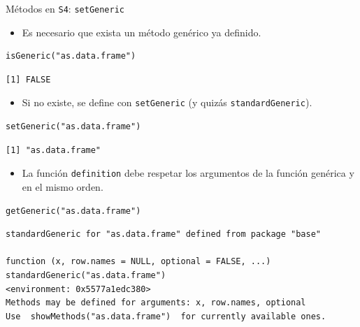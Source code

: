 \documentclass[xcolor={usenames,svgnames,dvipsnames}]{beamer}
\begin{document}
\begin{frame}[label={sec:org147fc40},fragile]{Métodos en \texttt{S4}: \texttt{setGeneric}}
 \begin{itemize}
\item Es necesario que exista un método genérico ya definido.
\end{itemize}
\lstset{language=r,label= ,caption= ,captionpos=b,numbers=none}
\begin{lstlisting}
isGeneric("as.data.frame")
\end{lstlisting}

\begin{verbatim}
[1] FALSE
\end{verbatim}


\begin{itemize}
\item Si no existe, se define con \texttt{setGeneric} (y quizás \texttt{standardGeneric}).
\end{itemize}
\lstset{language=r,label= ,caption= ,captionpos=b,numbers=none}
\begin{lstlisting}
setGeneric("as.data.frame")
\end{lstlisting}

\begin{verbatim}
[1] "as.data.frame"
\end{verbatim}


\begin{itemize}
\item La función \texttt{definition} debe respetar los argumentos de la función genérica y en el mismo orden.
\end{itemize}
\lstset{language=r,label= ,caption= ,captionpos=b,numbers=none}
\begin{lstlisting}
getGeneric("as.data.frame")
\end{lstlisting}

\begin{verbatim}
standardGeneric for "as.data.frame" defined from package "base"

function (x, row.names = NULL, optional = FALSE, ...) 
standardGeneric("as.data.frame")
<environment: 0x5577a1edc380>
Methods may be defined for arguments: x, row.names, optional
Use  showMethods("as.data.frame")  for currently available ones.
\end{verbatim}
\end{frame}
\end{document}
